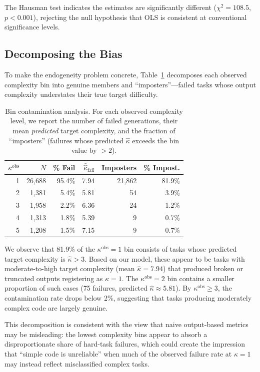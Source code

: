 \documentclass[conference]{IEEEtran}
\begin{document}
The Hausman test indicates the estimates are significantly different ($\chi^2 = 108.5$, $p < 0.001$), rejecting the null hypothesis that OLS is consistent at conventional significance levels.

\subsection{Decomposing the Bias}

To make the endogeneity problem concrete, Table~\ref{tab:contamination} decomposes each observed complexity bin into genuine members and ``imposters''---failed tasks whose output complexity understates their true target difficulty.

\begin{table}[h]
\centering
\caption{Bin contamination analysis. For each observed complexity level, we report the number of failed generations, their mean \emph{predicted} target complexity, and the fraction of ``imposters'' (failures whose predicted $\hat{\kappa}$ exceeds the bin value by $>2$).}
\label{tab:contamination}
\begin{tabular}{@{}rrrrrr@{}}
\toprule
$\kappa^{\text{obs}}$ & $N$ & \% Fail & $\bar{\hat{\kappa}}_{\text{fail}}$ & Imposters & \% Impost. \\
\midrule
1 & 26,688 & 95.4\% & 7.94 & 21,862 & 81.9\% \\
2 & 1,381 & 5.4\% & 5.81 & 54 & 3.9\% \\
3 & 1,958 & 2.2\% & 6.36 & 24 & 1.2\% \\
4 & 1,313 & 1.8\% & 5.39 & 9 & 0.7\% \\
5 & 1,208 & 1.5\% & 7.15 & 9 & 0.7\% \\
\bottomrule
\end{tabular}
\end{table}

We observe that 81.9\% of the $\kappa^{\text{obs}} = 1$ bin consists of tasks whose predicted target complexity is $\hat{\kappa} > 3$. Based on our model, these appear to be tasks with moderate-to-high target complexity (mean $\hat{\kappa} = 7.94$) that produced broken or truncated outputs registering as $\kappa = 1$. The $\kappa^{\text{obs}} = 2$ bin contains a smaller proportion of such cases (75 failures, predicted $\hat{\kappa} \approx 5.81$). By $\kappa^{\text{obs}} \geq 3$, the contamination rate drops below 2\%, suggesting that tasks producing moderately complex code are largely genuine.

This decomposition is consistent with the view that naive output-based metrics may be misleading: the lowest complexity bins appear to absorb a disproportionate share of hard-task failures, which could create the impression that ``simple code is unreliable'' when much of the observed failure rate at $\kappa = 1$ may instead reflect misclassified complex tasks.
\end{document}
